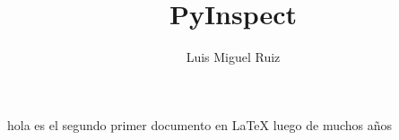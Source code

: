 \documentclass[10pt]{article}
\begin{document}
\title{PyInspect}
\author{Luis Miguel Ruiz}

\maketitle

hola es el segundo primer documento en LaTeX luego de muchos años
\end{document}
